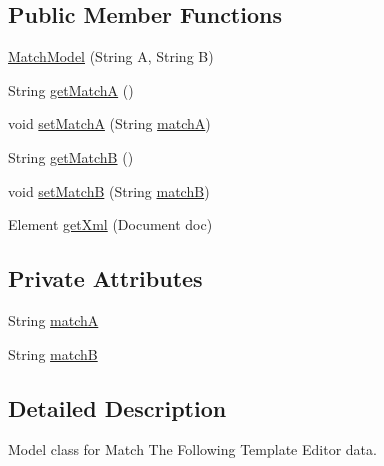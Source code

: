 \subsection*{Public Member Functions}
\begin{DoxyCompactItemize}
\item 
\hyperlink{classorg_1_1buildmlearn_1_1toolkit_1_1templates_1_1MatchModel_a8b5761fe8f0c778ef7c2c19fdb7f466f}{Match\+Model} (String A, String B)
\item 
String \hyperlink{classorg_1_1buildmlearn_1_1toolkit_1_1templates_1_1MatchModel_a7931cb604a878ec6c0162ef24a5c0e90}{get\+MatchA} ()
\item 
void \hyperlink{classorg_1_1buildmlearn_1_1toolkit_1_1templates_1_1MatchModel_a77f890d995485f334cceb374dfb629b2}{set\+MatchA} (String \hyperlink{classorg_1_1buildmlearn_1_1toolkit_1_1templates_1_1MatchModel_a45fbe0029fe3b22a1be5afa78378cb87}{matchA})
\item 
String \hyperlink{classorg_1_1buildmlearn_1_1toolkit_1_1templates_1_1MatchModel_a352fd939f6e0f9653fb0d344ed0d17b4}{get\+MatchB} ()
\item 
void \hyperlink{classorg_1_1buildmlearn_1_1toolkit_1_1templates_1_1MatchModel_a25d6173e431cfece681da4d3495d76e6}{set\+MatchB} (String \hyperlink{classorg_1_1buildmlearn_1_1toolkit_1_1templates_1_1MatchModel_a34eec27fe6736628eb371d5de5044347}{matchB})
\item 
Element \hyperlink{classorg_1_1buildmlearn_1_1toolkit_1_1templates_1_1MatchModel_afd2c3249c7a66062f3a1c6856c7b9966}{get\+Xml} (Document doc)
\end{DoxyCompactItemize}
\subsection*{Private Attributes}
\begin{DoxyCompactItemize}
\item 
String \hyperlink{classorg_1_1buildmlearn_1_1toolkit_1_1templates_1_1MatchModel_a45fbe0029fe3b22a1be5afa78378cb87}{matchA}
\item 
String \hyperlink{classorg_1_1buildmlearn_1_1toolkit_1_1templates_1_1MatchModel_a34eec27fe6736628eb371d5de5044347}{matchB}
\end{DoxyCompactItemize}


\subsection{Detailed Description}
Model class for Match The Following Template Editor data. 

